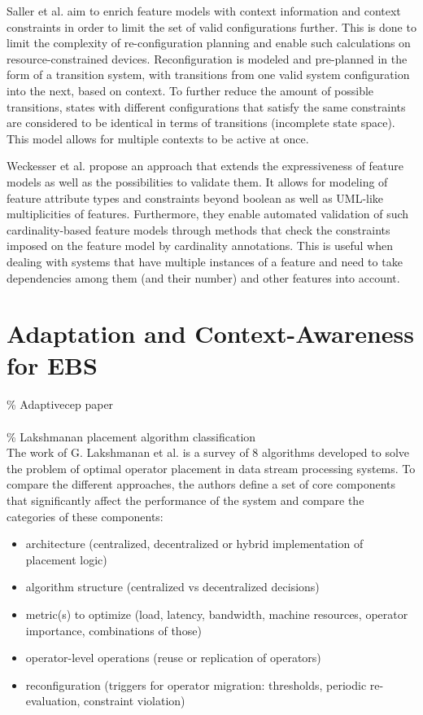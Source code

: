 Saller et al. aim to enrich feature models with context information and context constraints in order to limit the set of valid configurations further. This is done to limit the complexity of re-configuration planning and enable such calculations on resource-constrained devices. Reconfiguration is modeled and pre-planned in the form of a transition system, with transitions from one valid system configuration into the next, based on context. To further reduce the amount of possible transitions, states with different configurations that satisfy the same constraints are considered to be identical in terms of transitions (incomplete state space). This model allows for multiple contexts to be active at once.

Weckesser et al. propose an approach that extends the expressiveness of feature models as well as the possibilities to validate them. It allows for modeling  of feature attribute types and constraints beyond boolean as well as UML-like multiplicities of features. Furthermore, they enable automated validation of such cardinality-based feature models through methods that check the constraints imposed on the feature model by cardinality annotations. This is useful when dealing with systems that have multiple instances of a feature and need to take dependencies among them (and their number) and other features into account.

\section{Adaptation and Context-Awareness for EBS}
\% Adaptive\gls{cep} paper\\ \\
\% Lakshmanan placement algorithm classification \\
The work of G. Lakshmanan et al. \cite{Lakshmanan2008} is a survey of 8 algorithms developed to solve the problem of optimal operator placement in data stream processing systems. To compare the different approaches, the authors define a set of core components that significantly affect the performance of the system and compare the categories of these components: 

\begin{itemize}
\item architecture (centralized, decentralized or hybrid implementation of placement logic)
\item algorithm structure (centralized vs decentralized decisions)
\item metric(s) to optimize (load, latency, bandwidth, machine resources, operator importance, combinations of those)
\item operator-level operations (reuse or replication of operators) 
\item reconfiguration (triggers for operator migration: thresholds, periodic re-evaluation, constraint violation)
\end{itemize}

